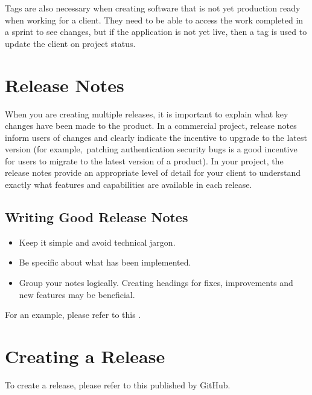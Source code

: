 \documentclass[letterpaper,10pt,english]{jupyterBook}
\begin{document}
\sphinxAtStartPar
Tags are also necessary when creating software that is not yet
production ready when working for a client. They need to be able to
access the work completed in a sprint to see changes, but if the
application is not yet live, then a tag is used to update the client on
project status.


\section{Release Notes}
\label{\detokenize{chapter_6/github:release-notes}}
\sphinxAtStartPar
When you are creating multiple releases, it is important to explain what
key changes have been made to the product. In a commercial project,
release notes inform users of changes and clearly indicate the incentive
to upgrade to the latest version (for example, patching authentication
security bugs is a good incentive for users to migrate to the latest
version of a product). In your project, the release notes provide an
appropriate level of detail for your client to understand exactly what
features and capabilities are available in each release.


\subsection{Writing Good Release Notes}
\label{\detokenize{chapter_6/github:writing-good-release-notes}}\begin{itemize}
\item {} 
\sphinxAtStartPar
Keep it simple and avoid technical jargon.

\item {} 
\sphinxAtStartPar
Be specific about what has been implemented.

\item {} 
\sphinxAtStartPar
Group your notes logically. Creating headings for fixes,
improvements and new features may be beneficial.

\end{itemize}

\sphinxAtStartPar
For an example, please refer to this .


\section{Creating a Release}
\label{\detokenize{chapter_6/github:creating-a-release}}
\sphinxAtStartPar
To create a release, please refer to this
published by GitHub.
\end{document}

